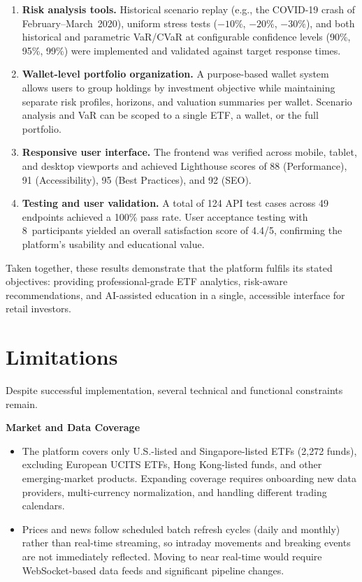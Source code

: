 \begin{enumerate}
    \item \textbf{Risk analysis tools.} Historical scenario replay (e.g., the COVID-19 crash of February--March~2020), uniform stress tests ($-10\%$, $-20\%$, $-30\%$), and both historical and parametric VaR/CVaR at configurable confidence levels (90\%, 95\%, 99\%) were implemented and validated against target response times.

    \item \textbf{Wallet-level portfolio organization.} A purpose-based wallet system allows users to group holdings by investment objective while maintaining separate risk profiles, horizons, and valuation summaries per wallet. Scenario analysis and VaR can be scoped to a single ETF, a wallet, or the full portfolio.

    \item \textbf{Responsive user interface.} The frontend was verified across mobile, tablet, and desktop viewports and achieved Lighthouse scores of 88 (Performance), 91 (Accessibility), 95 (Best Practices), and 92 (SEO).

    \item \textbf{Testing and user validation.} A total of 124 API test cases across 49 endpoints achieved a 100\% pass rate. User acceptance testing with 8~participants yielded an overall satisfaction score of 4.4/5, confirming the platform's usability and educational value.
\end{enumerate}

Taken together, these results demonstrate that the platform fulfils its stated objectives: providing professional-grade ETF analytics, risk-aware recommendations, and AI-assisted education in a single, accessible interface for retail investors.

\section{Limitations}

Despite successful implementation, several technical and functional constraints remain.

\textbf{Market and Data Coverage}
\begin{itemize}
    \item The platform covers only U.S.-listed and Singapore-listed ETFs (2,272 funds), excluding European UCITS ETFs, Hong Kong-listed funds, and other emerging-market products. Expanding coverage requires onboarding new data providers, multi-currency normalization, and handling different trading calendars.
    \item Prices and news follow scheduled batch refresh cycles (daily and monthly) rather than real-time streaming, so intraday movements and breaking events are not immediately reflected. Moving to near real-time would require WebSocket-based data feeds and significant pipeline changes.
\end{itemize}

